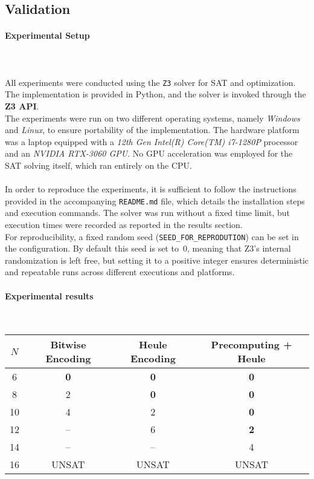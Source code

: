 \documentclass{article}
\begin{document}

\subsection{Validation}

\paragraph{Experimental Setup} \mbox{}\\
\\
All experiments were conducted using the \texttt{Z3} solver for SAT and
optimization. The implementation is provided in Python, and the solver is
invoked through the \textbf{Z3 API}. 
\\
The experiments were run on two different operating systems, namely
\emph{Windows} and \emph{Linux}, to ensure portability of the implementation.
The hardware platform was a laptop equipped with a \textit{12th Gen
Intel(R) Core(TM) i7-1280P} processor and an \textit{NVIDIA RTX-3060 GPU}. No GPU
acceleration was employed for the SAT solving itself, which ran entirely on
the CPU.  \\
\\
In order to reproduce the experiments, it is sufficient to follow the
instructions provided in the accompanying \texttt{README.md} file, which
details the installation steps and execution commands. The solver was run
without a fixed time limit, but execution times were recorded as reported in
the results section.
\\
For reproducibility, a fixed random seed (\texttt{SEED\_FOR\_REPRODUTION})
can be set in the configuration. By default this seed is set to~0, meaning
that Z3’s internal randomization is left free, but setting it to a positive
integer ensures deterministic and repeatable runs across different executions
and platforms.



\paragraph{Experimental results} \mbox{}\\

\begin{table}[h!]

\label{tab:results}
\begin{tabular}{c|c|c|c}
\hline
$N$ & Bitwise Encoding & Heule Encoding & Precomputing + Heule \\
\hline
6   & \textbf{0}  & \textbf{0}  & \textbf{0}  \\
8   & 2           & \textbf{0}  & \textbf{0}  \\
10  & 4           & 2           & \textbf{0}  \\
12  & --          & 6           & \textbf{2}  \\
14  & --          & --          & 4           \\
16  & UNSAT       & UNSAT       & UNSAT       \\
\hline
\end{tabular}
\end{table}
\end{document}
